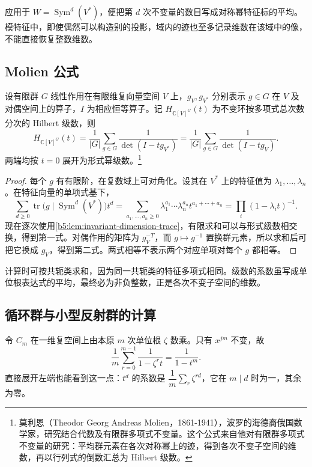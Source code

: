 应用于 \(W=\operatorname{Sym}^d(V^*)\)，便把第 \(d\) 次不变量的数目写成对称幂特征标的平均。模特征中，即使偶然可以构造别的投影，域内的迹也至多记录维数在该域中的像，不能直接恢复整数维数。

\subsection{Molien 公式}
\label{b5:subsec:2203:02}

\begin{theorem}[Molien 公式]\label{b5:thm:molien}
	设有限群 \(G\) 线性作用在有限维复向量空间 \(V\) 上，\(g_V,g_{V^*}\) 分别表示 \(g\in G\) 在 \(V\) 及对偶空间上的算子，\(I\) 为相应恒等算子。记 \(H_{\mathbb C[V]^G}(t)\) 为不变环按多项式总次数分次的 Hilbert 级数，则
	\[
		H_{\mathbb C[V]^G}(t) =\frac1{|G|}\sum_{g\in G}\frac1{\det(I-tg_{V^*})} =\frac1{|G|}\sum_{g\in G}\frac1{\det(I-tg_V)}.
	\]
	两端均按 \(t=0\) 展开为形式幂级数。\footnote{莫利恩（Theodor Georg Andreas Molien，1861-1941），波罗的海德裔俄国数学家，研究结合代数及有限群多项式不变量。这个公式来自他对有限群多项式不变量的研究：平均群元素在各次对称幂上的迹，得到各次不变子空间的维数，再以行列式的倒数汇总为 Hilbert 级数。}
\end{theorem}
\begin{proof}
	每个 \(g\) 有有限阶，在复数域上可对角化。设其在 \(V^*\) 上的特征值为 \(\lambda_1,\ldots,\lambda_n\)。在特征向量的单项式基下，
	\[
		\sum_{d\ge0}\operatorname{tr}\bigl(g\mid\operatorname{Sym}^d(V^*)\bigr)t^d =\sum_{a_1,\ldots,a_n\ge0}\lambda_1^{a_1}\cdots\lambda_n^{a_n}t^{a_1+\cdots+a_n} =\prod_i(1-\lambda_it)^{-1}.
	\]
	现在逐次使用\cref{b5:lem:invariant-dimension-trace}，有限求和可以与形式级数相交换，得到第一式。对偶作用的矩阵为 \(g_V^{-T}\)，而 \(g\mapsto g^{-1}\) 置换群元素，所以求和后可把它换成 \(g_V\)，得到第二式。两式相等不表示两个对应单项对每个 \(g\) 都相等。
\end{proof}

计算时可按共轭类求和，因为同一共轭类的特征多项式相同。级数的系数虽写成单位根表达式的平均，最终必为非负整数，正是各次不变子空间的维数。

\subsection{循环群与小型反射群的计算}
\label{b5:subsec:2203:03}

令 \(C_m\) 在一维复空间上由本原 \(m\) 次单位根 \(\zeta\) 数乘。只有 \(x^{jm}\) 不变，故
\[
	\frac1m\sum_{r=0}^{m-1}\frac1{1-\zeta^rt} =\frac1{1-t^m}.
\]
直接展开左端也能看到这一点：\(t^d\) 的系数是 \(\dfrac1m\sum_r\zeta^{rd}\)，它在 \(m\mid d\) 时为一，其余为零。

